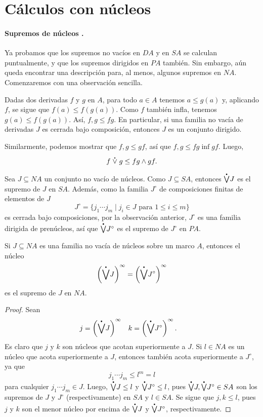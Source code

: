 \chapter{Cálculos con núcleos}
\label{ssec:calculos}

\subsubsection{Supremos de núcleos .}

Ya probamos que los supremos no vacíos en $DA$ y en $SA$ se
calculan puntualmente, y que los supremos dirigidos en $PA$
también.
Sin embargo, aún queda encontrar una descripción para, al menos,
algunos supremos en $NA$.
Comenzaremos con una observación sencilla.
\begin{obs}
  Dadas dos derivadas $f$ y $g$ en $A$,
  para todo $a\in A$ tenemos $a\leq g(a)$ y,
  aplicando $f$, se sigue que $f(a)\leq f(g(a))$.
  Como $f$ también infla, tenemos $g(a)\leq f(g(a))$.
  Así, $f,g\leq fg$. En particular, si una familia no vacía de
  derivadas $J$ es cerrada bajo composición, entonces $J$ es un
  conjunto dirigido.

  Similarmente, podemos mostrar que $f,g\leq gf$, así que  $f,g\leq
  fg\inf gf$. Luego,
  \[
    f\psup g \leq fg\inf gf
  .\]
\end{obs}

Sea $J\subseteq NA$ un conjunto no vacío de núcleos.
Como $J\subseteq SA$, entonces $\pSup J$ es el supremo de $J$ en $SA$.
Además, como la familia $J^\circ$
de composiciones finitas de elementos de $J$
\[
  J^\circ = \{j_1\cdots j_m \mid j_i\in J \text{ para } 1\leq
  i\leq m\}
\]
es cerrada bajo composiciones, por la observación anterior, $J^\circ$
es una familia dirigida de prenúcleos, así que $\pSup J^\circ$
es el supremo de $J^\circ$ en $PA$.

\begin{lemma}
  Si $J\subseteq NA$ es una familia no vacía de núcleos sobre un
  marco $A$, entonces el núcleo
  \[
    \left(\pSup J\right)^\infty = \left(\pSup J^\circ\right)^\infty
  \]
  es el supremo de $J$ en $NA$.
\end{lemma}
\begin{proof}
  Sean
  \begin{align*}
    j &= \left(\pSup J\right)^\infty &
    k &= \left(\pSup J^\circ\right)^\infty.
  \end{align*}
  Es claro que $j$ y $k$ son núcleos que acotan superiormente a
  $J$.
  Si $l\in NA$ es un núcleo que acota superiormente a $J$, entonces
  también acota superiormente a $J^\circ$, ya que
  \[
    j_1\cdots j_m \leq l^m = l
  \]
  para cualquier $j_1\cdots j_m\in J$.
  Luego, $\pSup J\leq l$ y $\pSup J^\circ \leq l$,
  pues $\pSup J,\pSup J^\circ\in SA$ son los supremos de $J$ y $J^\circ$
  (respectivamente) en $SA$ y $l\in SA$.
  Se sigue que $j,k\leq l$, pues $j$ y $k$ son el menor núcleo por
  encima de $\pSup J$ y $\pSup J^\circ$, respectivamente.
\end{proof}

